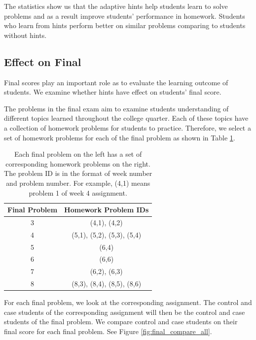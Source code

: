 \documentclass{llncs}
\begin{document}
The statistics show us that the adaptive hints help students learn to solve problems and as a result improve students' performance in homework. Students who learn from hints perform better on similar problems comparing to students without hints.

\subsection{Effect on Final}
Final scores play an important role as to evaluate the learning outcome of students. We examine whether hints have effect on students' final score.

The problems in the final exam aim to examine students understanding of different topics learned throughout the college quarter. Each of these topics have a collection of homework problems for students to practice. Therefore, we select a set of homework problems for each of the final problem as shown in Table \ref{tab:map}.

\begin{table}[h]
\caption{Each final problem on the left has a set of corresponding homework problems on the right. The problem ID is in the format of week number and problem number. For example, (4,1) means problem 1 of week 4 assignment.}
\begin{center}
  \begin{tabular}{ c | c }
   Final Problem & Homework Problem IDs \\ \hline
	3 & (4,1), (4,2) \\
	4 & (5,1), (5,2), (5,3), (5,4) \\
    5 & (6,4) \\
    6 & (6,6) \\
    7 & (6,2), (6,3) \\
    8 & (8,3), (8,4), (8,5), (8,6) \\ \hline
  \end{tabular}
  \label{tab:map}
  \end{center}
\end{table}

For each final problem, we look at the corresponding assignment. The control and case students of the corresponding assignment will then be the control and case students of the final problem. We compare control and case students on their final score for each final problem. See Figure \ref{fig:final_compare_all}.
\end{document}
